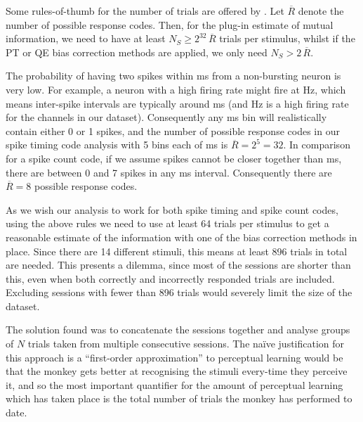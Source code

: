 Some rules-of-thumb for the number of trials are offered by \cite{Panzeri2007}.
Let $\overline{R}$ denote the number of possible response codes.
Then, for the plug-in estimate of mutual information, we need to have at least $N_S \ge 2^{32} \, \overline{R}$ trials per stimulus,
whilst if the PT or QE bias correction methods are applied, we only need $N_S > 2 \, \overline{R}$.

The probability of having two spikes within \unit[4]{ms} from a non-bursting neuron is very low. For example, a neuron with a high firing rate might fire at \unit[100]{Hz}, which means inter-spike intervals are typically around \unit[10]{ms} (and \unit[100]{Hz} is a high firing rate for the channels in our dataset).
Consequently any \unit[4]{ms} bin will realistically contain either 0 or 1 spikes, and the number of possible response codes in our spike timing code analysis with 5 bins each of \unit[4]{ms} is $\overline{R} = 2^5 = 32$. In comparison for a spike count code, if we assume spikes cannot be closer together than \unit[3]{ms}, there are between 0 and 7 spikes in any \unit[20]{ms} interval. Consequently there are $\overline{R} = 8$ possible response codes.

As we wish our analysis to work for both spike timing and spike count codes, using the above rules we need to use at least 64 trials per stimulus to get a reasonable estimate of the information with one of the bias correction methods in place.
Since there are 14 different stimuli, this means at least 896 trials in total are needed. This presents a dilemma, since most of the sessions are shorter than this, even when both correctly and incorrectly responded trials are included. Excluding sessions with fewer than 896 trials would severely limit the size of the dataset.

The solution found was to concatenate the sessions together and analyse groups of $N$ trials taken from multiple consecutive sessions.
The na\"{i}ve justification for this approach is a ``first-order approximation'' to perceptual learning would be that the monkey gets better at recognising the stimuli every-time they perceive it, and so the most important quantifier for the amount of perceptual learning which has taken place is the total number of trials the monkey has performed to date.

